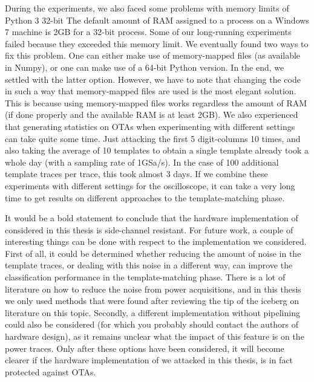 During the experiments, we also faced some problems with memory limits of Python 3 32-bit
The default amount of RAM assigned to a process on a Windows 7 machine is 2GB for a 32-bit process.
Some of our long-running experiments failed because they exceeded this memory limit.
We eventually found two ways to fix this problem.
One can either make use of memory-mapped files (as available in Numpy), or one can make use of a 64-bit Python version.
In the end, we settled with the latter option.
However, we have to note that changing the code in such a way that memory-mapped files are used is the most elegant solution.
This is because using memory-mapped files works regardless the amount of RAM (if done properly and the available RAM is at least 2GB).
We also experienced that generating statistics on OTAs when experimenting with different settings can take quite some time.
Just attacking the first 5 digit-columns 10 times, and also taking the average of 10 templates to obtain a single template already took a whole day (with a sampling rate of 1GSa/s).
In the case of 100 additional template traces per trace, this took almost 3 days.
If we combine these experiments with different settings for the oscilloscope, it can take a very long time to get results on different approaches to the template-matching phase.

It would be a bold statement to conclude that the hardware implementation of {\fourq} considered in this thesis is side-channel resistant.
For future work, a couple of interesting things can be done with respect to the {\fourq} implementation we considered.
First of all, it could be determined whether reducing the amount of noise in the template traces, or dealing with this noise in a different way, can improve the classification performance in the template-matching phase.
There is a lot of literature on how to reduce the noise from power acquisitions, and in this thesis we only used methods that were found after reviewing the tip of the iceberg on literature on this topic.
Secondly, a different implementation without pipelining could also be considered (for which you probably should contact the authors of {\fourqs} hardware design), as it remains unclear what the impact of this feature is on the power traces.
Only after these options have been considered, it will become clearer if the hardware implementation of {\fourq} we attacked in this thesis, is in fact protected against OTAs.